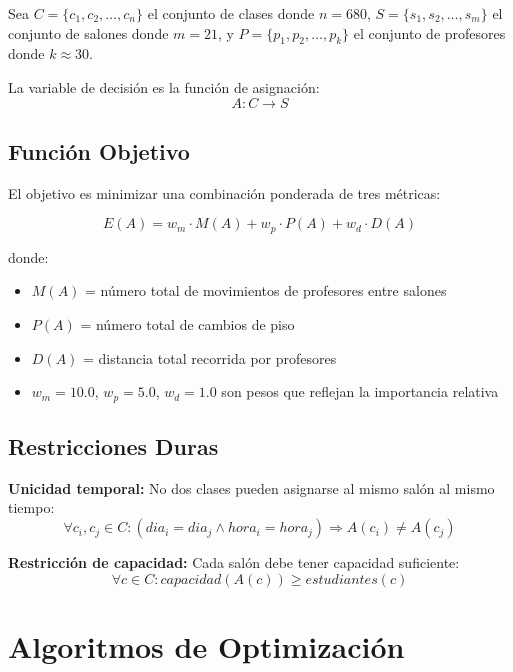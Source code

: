 \documentclass[12pt,a4paper]{article}
\begin{document}
Sea $C = \{c_1, c_2, \ldots, c_n\}$ el conjunto de clases donde $n = 680$, $S = \{s_1, s_2, \ldots, s_m\}$ el conjunto de salones donde $m = 21$, y $P = \{p_1, p_2, \ldots, p_k\}$ el conjunto de profesores donde $k \approx 30$.

La variable de decisión es la función de asignación:
\begin{equation}
A: C \rightarrow S
\end{equation}

\subsection{Función Objetivo}

El objetivo es minimizar una combinación ponderada de tres métricas:

\begin{equation}
E(A) = w_m \cdot M(A) + w_p \cdot P(A) + w_d \cdot D(A)
\label{eq:objective}
\end{equation}

donde:
\begin{itemize}
\item $M(A)$ = número total de movimientos de profesores entre salones
\item $P(A)$ = número total de cambios de piso
\item $D(A)$ = distancia total recorrida por profesores
\item $w_m = 10.0$, $w_p = 5.0$, $w_d = 1.0$ son pesos que reflejan la importancia relativa
\end{itemize}

\subsection{Restricciones Duras}

\textbf{Unicidad temporal:} No dos clases pueden asignarse al mismo salón al mismo tiempo:
\begin{equation}
\forall c_i, c_j \in C: (dia_i = dia_j \land hora_i = hora_j) \Rightarrow A(c_i) \neq A(c_j)
\end{equation}

\textbf{Restricción de capacidad:} Cada salón debe tener capacidad suficiente:
\begin{equation}
\forall c \in C: capacidad(A(c)) \geq estudiantes(c)
\end{equation}

\section{Algoritmos de Optimización}
\end{document}
